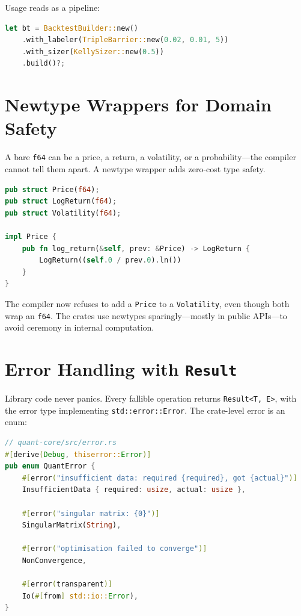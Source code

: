 Usage reads as a pipeline:

\begin{lstlisting}[language=Rust]
let bt = BacktestBuilder::new()
    .with_labeler(TripleBarrier::new(0.02, 0.01, 5))
    .with_sizer(KellySizer::new(0.5))
    .build()?;
\end{lstlisting}


\section{Newtype Wrappers for Domain Safety}

A bare \texttt{f64} can be a price, a return, a volatility, or a
probability---the compiler cannot tell them apart. A newtype wrapper
adds zero-cost type safety.

\begin{lstlisting}[language=Rust]
pub struct Price(f64);
pub struct LogReturn(f64);
pub struct Volatility(f64);

impl Price {
    pub fn log_return(&self, prev: &Price) -> LogReturn {
        LogReturn((self.0 / prev.0).ln())
    }
}
\end{lstlisting}

The compiler now refuses to add a \texttt{Price} to a
\texttt{Volatility}, even though both wrap an \texttt{f64}. The
 crates use newtypes sparingly---mostly in public
APIs---to avoid ceremony in internal computation.

\section{Error Handling with \texttt{Result}}

Library code never panics. Every fallible operation returns
\texttt{Result<T, E>}, with the error type implementing
\texttt{std::error::Error}. The crate-level error is an enum:

\begin{lstlisting}[language=Rust]
// quant-core/src/error.rs
#[derive(Debug, thiserror::Error)]
pub enum QuantError {
    #[error("insufficient data: required {required}, got {actual}")]
    InsufficientData { required: usize, actual: usize },

    #[error("singular matrix: {0}")]
    SingularMatrix(String),

    #[error("optimisation failed to converge")]
    NonConvergence,

    #[error(transparent)]
    Io(#[from] std::io::Error),
}
\end{lstlisting}

